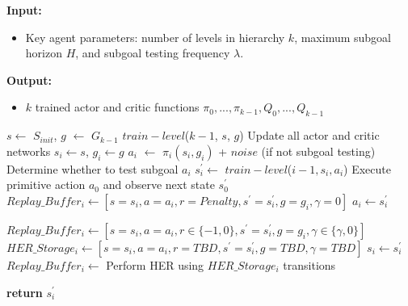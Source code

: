 \documentclass{article} %
\begin{document}
\begin{algorithm}
\caption{Hierarchical Actor-Critic (HAC)}\label{alg:HAC}
\begin{algorithmic}



\State \textbf{Input:}
    \begin{itemize}
    \item Key agent parameters: number of levels in hierarchy $k$, maximum subgoal horizon $H$, and subgoal testing frequency $\lambda$. 
    \end{itemize}
\State \textbf{Output:}
    \begin{itemize}
    \item $k$ trained actor and critic functions $\pi_0, ..., \pi_{k-1}, Q_0, ... , Q_{k-1}$
    \end{itemize}

    
\State
{} 
    \State $s \leftarrow$ $S_{init}$, $g$ $\leftarrow$ $G_{k-1}$ 
    \State $train-level$($k-1$, $s$, $g$) 
    \State Update all actor and critic networks
\EndFor
\State
{}
\State $s_i \gets s$, $g_i \gets g$ 
    \State $a_i$ $\gets$ $\pi_i(s_i, g_i)$ + $noise$ (if not subgoal testing) 
        \State Determine whether to test subgoal $a_i$
        \State $s_{i}^{'} \gets$ $train-level$($i-1, s_i, a_i$) 
    \Else
        \State Execute primitive action $a_0$ and observe next state $s_{0}^{'}$
    \EndIf
    \State  {}
         
            \State $Replay\_Buffer_i \gets [s = s_i, a = a_i, r = Penalty, s^{'} = s_{i}^{'}, g = g_{i}, \gamma = 0]$
        \EndIf
        \State $a_i \gets s_i^{'}$ 
    \EndIf

    \State {}
    \State $Replay\_Buffer_i \gets [s = s_i, a = a_i, r \in \{-1,0\}, s^{'} = s_{i}^{'}, g = g_{i}, \gamma \in \{\gamma, 0\}]$
    \State $HER\_Storage_i \gets [s = s_i, a = a_i, r = TBD, s^{'} = s_{i}^{'}, g = TBD, \gamma = TBD]$
    \State $s_i \gets s_i^{'}$
\EndFor
\State $Replay\_Buffer_i \gets$ Perform HER using $HER\_Storage_i$ transitions

\State \textbf{return} $s_i^{'}$
\EndFunction

\end{algorithmic}
\end{algorithm}
\end{document}
